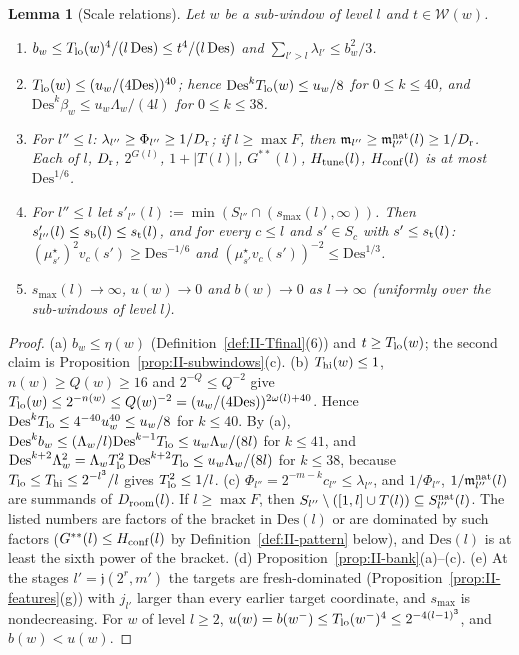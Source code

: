 \documentclass[10pt]{amsart}
\newtheorem{lemma}[theorem]{Lemma}
\theoremstyle{definition}
\theoremstyle{remark}
\begin{document}
\begin{lemma}[Scale relations]\label{lem:II-scales}
Let $w$ be a sub-window of level $l$ and $t\in\mathcal W(w)$.
\begin{enumerate}
\item[(a)] $b_w\le T_{\rm lo}(w)^4/(l\,\mathrm{Des})\le t^4/(l\,\mathrm{Des})$
and $\sum_{l'>l}\lambda_{l'}\le b_w^2/3$.
\item[(b)] $T_{\rm lo}(w)\le(u_w/(4\mathrm{Des}))^{40}$; hence
$\mathrm{Des}^kT_{\rm lo}(w)\le u_w/8$ for $0\le k\le40$, and
$\mathrm{Des}^k\beta_w\le u_w\Lambda_w/(4l)$ for $0\le k\le38$.
\item[(c)] For $l''\le l$: $\lambda_{l''}\ge\Phi_{l''}\ge1/D_{\rm r}$; if
$l\ge\max F$, then $\mathfrak m_{l''}\ge\mathfrak m^{\rm nat}_{l''}(l)\ge
1/D_{\rm r}$.  Each of $l$, $D_{\rm r}$, $2^{G(l)}$, $1+|T(l)|$,
$G^{**}(l)$, $H_{\rm tune}(l)$, $H_{\rm conf}(l)$ is at most
$\mathrm{Des}^{1/6}$.
\item[(d)] For $l''\le l$ let $s'_{l''}(l):=\min(S_{l''}\cap(s_{\max}(l),
\infty))$.  Then $s'_{l''}(l)\le s_{\rm b}(l)\le s_{\rm t}(l)$, and for every
$c\le l$ and $s'\in S_c$ with $s'\le s_{\rm t}(l)$:
$(\mu^\star_{s'})^2v_c(s')\ge\mathrm{Des}^{-1/6}$ and
$(\mu^\star_{s'}v_c(s'))^{-2}\le\mathrm{Des}^{1/3}$.
\item[(e)] $s_{\max}(l)\to\infty$, $u(w)\to0$ and $b(w)\to0$ as
$l\to\infty$ \textup{(}uniformly over the sub-windows of level $l$\textup{)}.
\end{enumerate}
\end{lemma}

\begin{proof}
(a) $b_w\le\eta(w)$ (Definition~\ref{def:II-Tfinal}(6)) and $t\ge
T_{\rm lo}(w)$; the second claim is Proposition~\ref{prop:II-subwindows}(c).
(b) $T_{\rm hi}(w)\le1$, $n(w)\ge Q(w)\ge16$ and $2^{-Q}\le Q^{-2}$ give
$T_{\rm lo}(w)\le2^{-n(w)}\le Q(w)^{-2}=(u_w/(4\mathrm{Des}))^{2\omega(l)+40}$.
Hence $\mathrm{Des}^kT_{\rm lo}\le4^{-40}u_w^{40}\le u_w/8$ for $k\le40$.
By (a), $\mathrm{Des}^kb_w\le(\Lambda_w/l)\mathrm{Des}^{k-1}T_{\rm lo}\le
u_w\Lambda_w/(8l)$ for $k\le41$, and $\mathrm{Des}^{k+2}\Lambda_w^2=
\Lambda_wT_{\rm lo}^2\,\mathrm{Des}^{k+2}T_{\rm lo}\le u_w\Lambda_w/(8l)$ for
$k\le38$, because $T_{\rm lo}\le T_{\rm hi}\le2^{-l^3}/l$ gives
$T_{\rm lo}^2\le1/l$.
(c) $\Phi_{l''}=2^{-m-k}c_{l''}\le\lambda_{l''}$, and $1/\Phi_{l''}$,
$1/\mathfrak m^{\rm nat}_{l''}(l)$ are summands of $D_{\rm room}(l)$.  If
$l\ge\max F$, then $S_{l''}\setminus([1,l]\cup T(l))\subseteq
S^{\rm nat}_{l''}(l)$.  The listed numbers are factors of the bracket in
$\mathrm{Des}(l)$ or are dominated by such factors ($G^{**}(l)\le
H_{\rm conf}(l)$ by Definition~\ref{def:II-pattern} below), and
$\mathrm{Des}(l)$ is at least the sixth power of the bracket.
(d) Proposition~\ref{prop:II-bank}(a)--(c).
(e) At the stages $l'=\mathfrak j(2^r,m')$ the targets are fresh-dominated
(Proposition~\ref{prop:II-features}(g)) with $j_{l'}$ larger than every
earlier target coordinate, and $s_{\max}$ is nondecreasing.  For $w$ of
level $l\ge2$, $u(w)=b(w^-)\le T_{\rm lo}(w^-)^4\le2^{-4(l-1)^3}$, and
$b(w)<u(w)$.
\end{proof}
\end{document}
